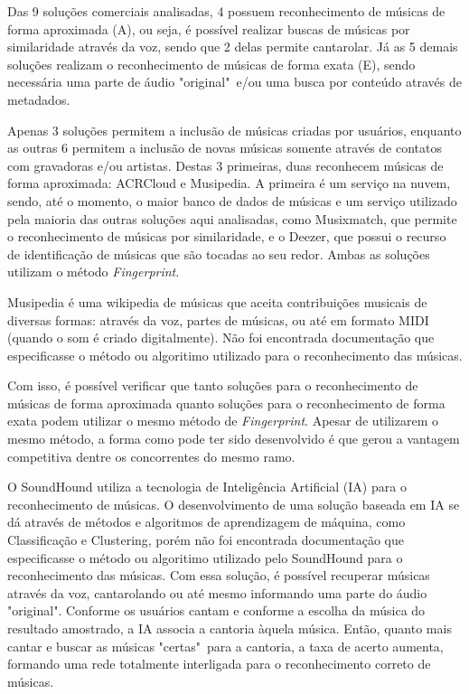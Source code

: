 Das 9 soluções comerciais analisadas, 4 possuem reconhecimento de músicas de forma aproximada (A), ou seja, é possível realizar buscas de músicas por similaridade através da voz, sendo que 2 delas permite cantarolar. Já as 5 demais soluções realizam o reconhecimento de músicas de forma exata (E), sendo necessária uma parte de áudio "original"\ e/ou uma busca por conteúdo através de metadados.

Apenas 3 soluções permitem a inclusão de músicas criadas por usuários, enquanto as outras 6 permitem a inclusão de novas músicas somente através de contatos com gravadoras e/ou artistas. Destas 3 primeiras, duas reconhecem músicas de forma aproximada: ACRCloud e Musipedia. A primeira é um serviço na nuvem, sendo, até o momento, o maior banco de dados de músicas e um serviço utilizado pela maioria das outras soluções aqui analisadas, como Musixmatch, que permite o reconhecimento de músicas por similaridade, e o Deezer, que possui o recurso de identificação de músicas que são tocadas ao seu redor. Ambas as soluções utilizam o método \textit{Fingerprint}.

Musipedia é uma wikipedia de músicas que aceita contribuições musicais de diversas formas: através da voz, partes de músicas, ou até em formato MIDI (quando o som é criado digitalmente). Não foi encontrada documentação que especificasse o método ou algoritimo utilizado para o reconhecimento das músicas.

Com isso, é possível verificar que tanto soluções para o reconhecimento de músicas de forma aproximada quanto soluções para o reconhecimento de forma exata podem utilizar o mesmo método de \textit{Fingerprint}. Apesar de utilizarem o mesmo método, a forma como pode ter sido desenvolvido é que gerou a vantagem competitiva dentre os concorrentes do mesmo ramo.

O SoundHound utiliza a tecnologia de Inteligência Artificial (IA)  para o reconhecimento de músicas. O desenvolvimento de uma solução baseada em IA se dá através de métodos e algoritmos de aprendizagem de máquina, como Classificação e Clustering, porém não foi encontrada documentação que especificasse o método ou algoritimo utilizado pelo SoundHound para o reconhecimento das músicas. Com essa solução, é possível recuperar músicas através da voz, cantarolando ou até mesmo informando uma parte do áudio "original". Conforme os usuários cantam e conforme a escolha da música do resultado amostrado, a IA associa a cantoria àquela música. Então, quanto mais cantar e buscar as músicas "certas"\ para a cantoria, a taxa de acerto aumenta, formando uma rede totalmente interligada para o reconhecimento correto de músicas.

